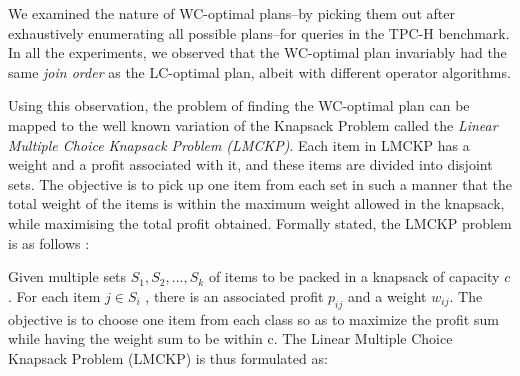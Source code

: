 \documentclass{article}
\begin{document}
We examined the nature of WC-optimal plans--by picking them out after
exhaustively enumerating all possible plans--for queries in the TPC-H
benchmark.  In all the experiments, we observed that the WC-optimal plan
invariably had the same \emph{join order} as the LC-optimal plan, albeit with
different operator algorithms. 




Using this observation, the problem of finding the WC-optimal plan can be
mapped to the well known variation of the Knapsack Problem called the
\emph{Linear Multiple Choice Knapsack Problem (LMCKP)}. Each item in LMCKP has
a weight and a profit associated with it, and these items are divided into
disjoint sets. The objective is to pick up one item from each set in such a
manner that the total weight of the items is within the maximum weight allowed
in the knapsack, while maximising the total profit obtained. Formally stated,
the LMCKP problem is as follows \cite{lmckp}:

Given multiple sets $S_1, S_2,..., S_k$ of items to be packed in a
knapsack of capacity $c$. For each item $j \in S_i$ , there is an associated
profit $p_{ij}$ and a weight $w_{ij}$. The objective is to choose one item from
each class so as to maximize the profit sum while having the weight sum to be
within c. The Linear Multiple Choice Knapsack Problem (LMCKP) is  
thus formulated as:
\end{document}
